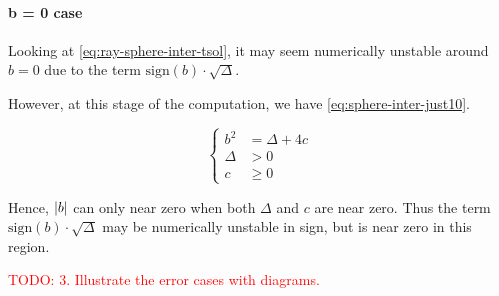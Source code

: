 \paragraph{b = 0 case}
Looking at \cref{eq:ray-sphere-inter-tsol}, it may seem numerically
unstable around $b = 0$ due to the term $\textrm{sign}(b) \cdot \sqrt{\Delta}$.

However, at this stage of the computation, we have
\cref{eq:sphere-inter-just10}.

\begin{equation} \label{eq:sphere-inter-just10} \begin{cases}
b^2 &= \Delta + 4 c \\
\Delta &> 0 \\
c &\geq 0
\end{cases} \end{equation}

Hence, $\abs{b}$ can only near zero when both $\Delta$ and $c$ are near zero.
Thus the term $\textrm{sign}(b) \cdot \sqrt{\Delta}$ may be numerically
unstable in sign, but is near zero in this region.

\textcolor{red}{TODO:
3. Illustrate the error cases with diagrams.}


